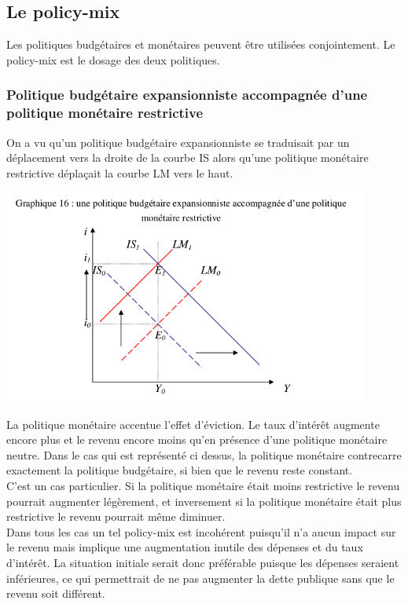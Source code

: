 \documentclass[10pt]{book}
\begin{document}
\subsection{Le policy-mix}
Les politiques budgétaires et monétaires peuvent être utilisées conjointement. Le policy-mix est le dosage des deux politiques.
\subsubsection{Politique budgétaire expansionniste accompagnée d'une politique monétaire restrictive}
On a vu qu'un politique budgétaire expansionniste se traduisait par un déplacement vers la droite de la courbe IS alors qu'une politique monétaire restrictive déplaçait la courbe LM vers le haut.
\begin{center}
  \includegraphics[width=12cm]{graph41.png}
\end{center}
La politique monétaire accentue l'effet d'éviction. Le taux d'intérêt augmente encore plus et le revenu encore moins qu'en présence d'une politique monétaire neutre. Dans le cas qui est représenté ci dessus, la politique monétaire contrecarre exactement la politique budgétaire, si bien que le revenu reste constant. \\
C'est un cas particulier. Si la politique monétaire était moins restrictive le revenu pourrait augmenter légèrement, et inversement si la politique monétaire était plus restrictive le revenu pourrait même diminuer. \\
Dans tous les cas un tel policy-mix est incohérent puisqu'il n'a aucun impact sur le revenu mais implique une augmentation inutile des dépenses et du taux d'intérêt. La situation initiale serait donc préférable puisque les dépenses seraient inférieures, ce qui permettrait de ne pas augmenter la dette publique sans que le revenu soit différent.
\end{document}
